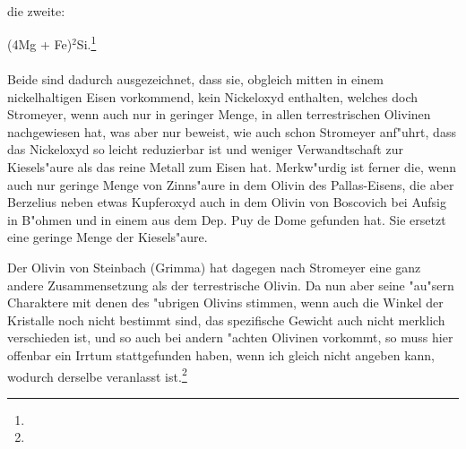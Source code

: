 \documentclass[a4paper, 11pt, oneside]{article}
\begin{document}
\paragraph{}
die zweite:
\begin{center}
(4Mg + Fe)$^{2}$Si.\footnote{}
\end{center}
\paragraph{}
Beide sind dadurch ausgezeichnet, dass sie, obgleich mitten in einem nickelhaltigen Eisen vorkommend, kein Nickeloxyd enthalten, welches doch Stromeyer, wenn auch nur in geringer Menge, in allen terrestrischen Olivinen nachgewiesen hat, was aber nur beweist, wie auch schon Stromeyer anf"uhrt, dass das Nickeloxyd so leicht reduzierbar ist und weniger Verwandtschaft zur Kiesels"aure als das reine Metall zum Eisen hat. Merkw"urdig ist ferner die, wenn auch nur geringe Menge von Zinns"aure in dem Olivin des Pallas-Eisens, die aber Berzelius neben etwas Kupferoxyd auch in dem Olivin von Boscovich bei Aufsig in B"ohmen und in einem aus dem Dep. Puy de Dome gefunden hat. Sie ersetzt eine geringe Menge der Kiesels"aure.

Der Olivin von Steinbach (Grimma) hat dagegen nach Stromeyer eine ganz andere Zusammensetzung als der terrestrische Olivin. Da nun aber seine "au"sern Charaktere mit denen des "ubrigen Olivins stimmen, wenn auch die Winkel der Kristalle noch nicht bestimmt sind, das spezifische Gewicht auch nicht merklich verschieden ist, und so auch bei andern "achten Olivinen vorkommt, so muss hier offenbar ein Irrtum stattgefunden haben, wenn ich gleich nicht angeben kann, wodurch derselbe veranlasst ist.\footnote{}
\end{document}
